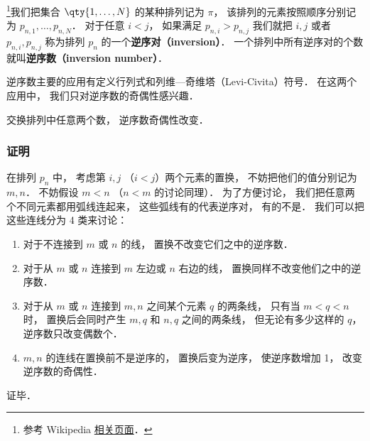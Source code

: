 
\begin{issues}
\issueDraft
\end{issues}


\footnote{参考 Wikipedia \href{https://en.wikipedia.org/wiki/Inversion_(discrete_mathematics)}{相关页面}．}我们把集合 $\qty{1,\dots,N}$ 的某种排列记为 $\pi$， 该排列的元素按照顺序分别记为 $p_{n,1}, \dots, p_{n,N}$． 对于任意 $i < j$， 如果满足 $p_{n,i} > p_{n,j}$ 我们就把 $i, j$ 或者 $p_{n,i}, p_{n,j}$ 称为排列 $p_n$ 的一个\textbf{逆序对（inversion）}． 一个排列中所有逆序对的个数就叫\textbf{逆序数（inversion number）}．

逆序数主要的应用有定义行列式和列维—奇维塔（Levi-Civita）符号． 在这两个应用中， 我们只对逆序数的奇偶性感兴趣．

\begin{theorem}{}
交换排列中任意两个数， 逆序数奇偶性改变． 
\end{theorem}

\subsubsection{证明}
在排列 $p_n$ 中， 考虑第 $i, j$ （$i < j$）两个元素的置换， 不妨把他们的值分别记为 $m, n$． 不妨假设 $m < n$ （$n < m$ 的讨论同理）． 为了方便讨论， 我们把任意两个不同元素都用弧线连起来， 这些弧线有的代表逆序对， 有的不是． 我们可以把这些连线分为 4 类来讨论：
\begin{enumerate}
\item 对于不连接到 $m$ 或 $n$ 的线， 置换不改变它们之中的逆序数．
\item 对于从 $m$ 或 $n$ 连接到 $m$ 左边或 $n$ 右边的线， 置换同样不改变他们之中的逆序数．
\item 对于从 $m$ 或 $n$ 连接到 $m, n$ 之间某个元素 $q$ 的两条线， 只有当 $m < q < n$ 时， 置换后会同时产生 $m,q$ 和 $n,q$ 之间的两条线， 但无论有多少这样的 $q$， 逆序数只改变偶数个．
\item $m,n$ 的连线在置换前不是逆序的， 置换后变为逆序， 使逆序数增加 1， 改变逆序数的奇偶性．
\end{enumerate}
证毕．
